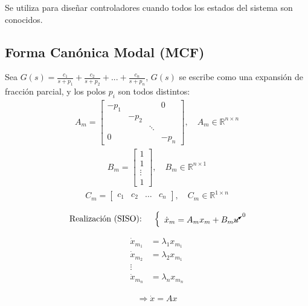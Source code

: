 Se utiliza para diseñar controladores cuando todos los estados del sistema son conocidos.

\subsection{Forma Canónica Modal (MCF)}
Sea $G(s)=\frac{c_1}{s+p_1}+\frac{c_2}{s+p_2}+...+\frac{c_n}{s+p_n}$, $G(s)$ se escribe como una expansión de fracción parcial, y los polos $p_i$ son todos distintos:
\begin{align*}
{A_m}=\left[
    \begin{array}{cccc}
     -p_1& & & 0\\
     & -p_2 & & \\
     & & \ddots & \\
     0 & & & -p_n
    \end{array}\right], \quad {A_m}\in \mathbb{R}^{n\times n}
\end{align*}
\begin{align*}
{B_m}=\left[
    \begin{array}{c}
     1 \\ 
     1\\
    \vdots\\
     1  
    \end{array}\right], \quad {B_m}\in \mathbb{R}^{n\times 1}
\end{align*}
\begin{align*}
{C_m}=\left[
    \begin{array}{cccc}
     c_1 & c_2 & \dots & c_n
    \end{array}\right], \quad {C_m}\in \mathbb{R}^{1\times n}
\end{align*}

\begin{align*}
    \text{Realización (SISO): }\quad 
    \left\{
    \begin{array}{l}
          {\dot{x}_m}={A_m}{x_m}+{B_m}\cancelto{0}{u} 
    \end{array} 
    \right. 
\end{align*}

\begin{align*}
    \dot{x}_{m_1} &= \lambda_1x_{m_1}\\
    \dot{x}_{m_2} &= \lambda_2x_{m_1}\\
    \vdots \\
    \dot{x}_{m_n} &= \lambda_nx_{m_n}
\end{align*}

\begin{align*}
    \Longrightarrow{\dot{x}}={A}{x}
\end{align*}

